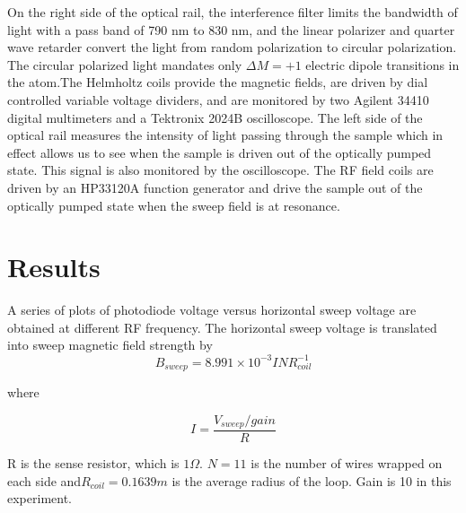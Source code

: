 \documentclass[prb,preprint]{revtex4-1}
\begin{document}
On the right side of the optical rail, the interference filter limits the bandwidth of light with a pass band of 790 nm to 830 nm, and the linear polarizer and quarter wave retarder convert the light from random polarization to circular polarization. The circular polarized light mandates only $\Delta M=+1$ electric dipole transitions in the atom.The Helmholtz coils provide the magnetic fields, are driven by dial controlled variable voltage dividers, and are monitored by two Agilent 34410 digital multimeters and a Tektronix 2024B oscilloscope. The left side of the optical rail measures the intensity of light passing through the sample which in effect allows us to see when the sample is driven out of the optically pumped state. This signal is also monitored by the oscilloscope. The RF field coils are driven by an HP33120A function generator and drive the sample out of the optically pumped state when the sweep field is at resonance.


\section{Results}

A series of plots of photodiode voltage versus horizontal sweep voltage are obtained at different RF frequency. The horizontal sweep voltage is translated into sweep magnetic field strength by
\begin{equation}
B_{sweep}=8.991\times10^{-3} I N R_{coil}^{-1}
\label{vtob}
\end{equation}

where

\begin{equation}
I=\frac{V_{sweep}/gain}{R}
\label{vtoi}
\end{equation}

R is the sense resistor, which is $1 \Omega$. $N=11$ is the number of wires wrapped on each side and$R_{coil}=0.1639m$ is the average radius of the loop. Gain is 10 in this experiment. \\
\end{document}
